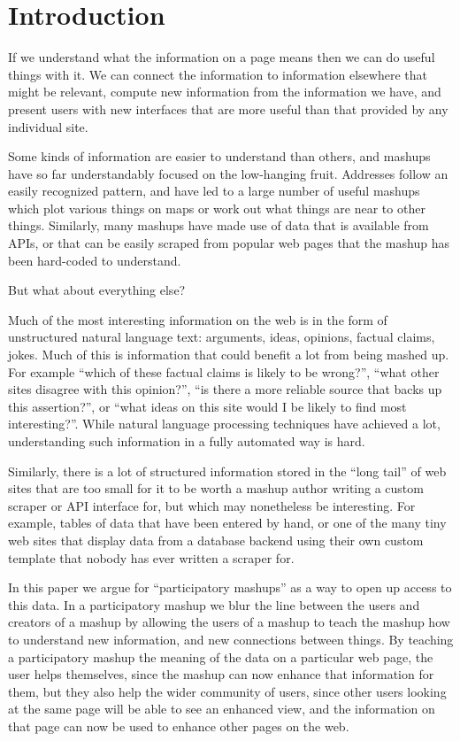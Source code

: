 \documentclass{chi2009}
\begin{document}
\section{Introduction}

If we understand what the information on a page means then we can do useful things with it. We can connect the information to information elsewhere that might be relevant, compute new information from the information we have, and present users with new interfaces that are more useful than that provided by any individual site. 

Some kinds of information are easier to understand than others, and mashups have so far understandably focused on the low-hanging fruit. Addresses follow an easily recognized pattern, and have led to a large number of useful mashups which plot various things on maps or work out what things are near to other things. Similarly, many mashups have made use of data that is available from APIs, or that can be easily scraped from popular web pages that the mashup has been hard-coded to understand.

But what about everything else? 

Much of the most interesting information on the web is in the form of unstructured natural language text: arguments, ideas, opinions, factual claims, jokes. Much of this is information that could benefit a lot from being mashed up. For example ``which of these factual claims is likely to be wrong?'', ``what other sites disagree with this opinion?'', ``is there a more reliable source that backs up this assertion?'', or ``what ideas on this site would I be likely to find most interesting?''. While natural language processing techniques have achieved a lot, understanding such information in a fully automated way is hard.

Similarly, there is a lot of structured information stored in the ``long tail'' of web sites that are too small for it to be worth a mashup author writing a custom scraper or API interface for, but which may nonetheless be interesting. For example, tables of data that have been entered by hand, or one of the many tiny web sites that display data from a database backend using their own custom template that nobody has ever written a scraper for.

In this paper we argue for ``participatory mashups'' as a way to open up access to this data. In a participatory mashup we blur the line between the users and creators of a mashup by allowing the users of a mashup to teach the mashup how to understand new information, and new connections between things. By teaching a participatory mashup the meaning of the data on a particular web page, the user helps themselves, since the mashup can now enhance that information for them, but they also help the wider community of users, since other users looking at the same page will be able to see an enhanced view, and the information on that page can now be used to enhance other pages on the web.
\end{document}
